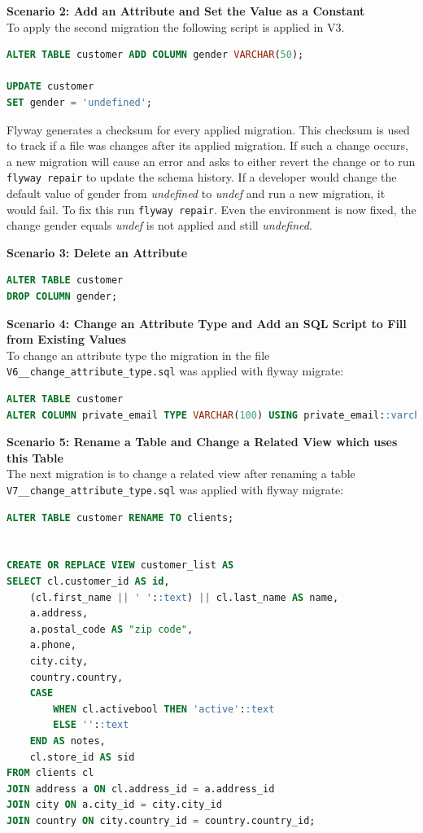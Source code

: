 \textbf{Scenario 2: Add an Attribute and Set the Value as a Constant}\\
%
To apply the second migration the following script is applied in V3.
\begin{lstlisting}[language=SQL]
ALTER TABLE customer ADD COLUMN gender VARCHAR(50);

UPDATE customer
SET gender = 'undefined';
\end{lstlisting}
Flyway generates a checksum for every applied migration. This checksum is used to track if a file was changes after its applied migration. If such a change occurs, a new migration will cause an error and asks to either revert the change or to run \texttt{flyway repair} to update the schema history.
If a developer would change the default value of gender from \textit{undefined} to \textit{undef} and run a new migration, it would fail. To fix this run \texttt{flyway repair}. Even the environment is now fixed, the change gender equals \textit{undef} is not applied and still \textit{undefined}.


\textbf{Scenario 3: Delete an Attribute}\\
%

\begin{lstlisting}[language=SQL]
ALTER TABLE customer
DROP COLUMN gender;
\end{lstlisting}


\textbf{Scenario 4: Change an Attribute Type and Add an SQL Script to Fill from Existing Values}\\
%
To change an attribute type the migration in the file \texttt{V6\_\_change\_attribute\_type.sql} was applied with flyway migrate:
\begin{lstlisting}[language=SQL]
ALTER TABLE customer
ALTER COLUMN private_email TYPE VARCHAR(100) USING private_email::varchar;
\end{lstlisting}


\textbf{Scenario 5: Rename a Table and Change a Related View which uses this Table}\\
%
The next migration is to change a related view after renaming a table\\
\texttt{V7\_\_change\_attribute\_type.sql} was applied with flyway migrate:
\begin{lstlisting}[language=SQL]
ALTER TABLE customer RENAME TO clients;
	
	
CREATE OR REPLACE VIEW customer_list AS
SELECT cl.customer_id AS id,
	(cl.first_name || ' '::text) || cl.last_name AS name,
	a.address,
	a.postal_code AS "zip code",
	a.phone,
	city.city,
	country.country,
	CASE
		WHEN cl.activebool THEN 'active'::text
		ELSE ''::text
	END AS notes,
	cl.store_id AS sid
FROM clients cl
JOIN address a ON cl.address_id = a.address_id
JOIN city ON a.city_id = city.city_id
JOIN country ON city.country_id = country.country_id;
\end{lstlisting}

